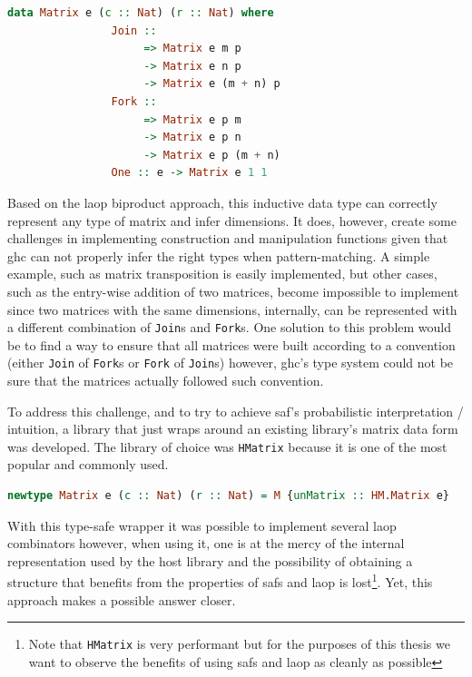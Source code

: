 \documentclass[
  oneside,
  11pt, a4paper,
  footinclude=true,
  headinclude=true,
  cleardoublepage=empty
]{scrbook}
\theoremstyle{definition}
\theoremstyle{definition}
\begin{document}
        \begin{lstlisting}[language=Haskell, label={lst:nat-matrix}, caption={Inductive matrix definition},captionpos=b]
            data Matrix e (c :: Nat) (r :: Nat) where
                Join :: 
                     => Matrix e m p 
                     -> Matrix e n p 
                     -> Matrix e (m + n) p
                Fork ::
                     => Matrix e p m 
                     -> Matrix e p n 
                     -> Matrix e p (m + n)
                One :: e -> Matrix e 1 1
        \end{lstlisting}{}
        
        Based on the \gls{laop} biproduct approach, this inductive data type can correctly represent any type of matrix and infer dimensions. It does, however, create some challenges in implementing construction and manipulation functions given that \gls{ghc} can not properly infer the right types when pattern-matching. A simple example, such as matrix transposition is easily implemented, but other cases, such as the entry-wise addition of two matrices, become impossible to implement since two matrices with the same dimensions, internally, can be represented with a different combination of \texttt{Join}s and \texttt{Fork}s. One solution to this problem would be to find a way to ensure that all matrices were built according to a convention (either \texttt{Join} of \texttt{Fork}s or \texttt{Fork} of \texttt{Join}s) however, \gls{ghc}'s type system could not be sure that the matrices actually followed such convention.
	    
	    To address this challenge, and to try to achieve \gls{saf}'s probabilistic interpretation / intuition, a library that just wraps around an existing library's matrix data form was developed. The library of choice was \texttt{HMatrix} \citep{hmatrix} because it is one of the most popular and commonly used.
	    
        \begin{lstlisting}[language=Haskell, label={lst:m-type-2}, caption={Type-safe wrapper around HMatrix},captionpos=b]
        newtype Matrix e (c :: Nat) (r :: Nat) = M {unMatrix :: HM.Matrix e}
        \end{lstlisting}{}
        
        With this type-safe wrapper it was possible to implement several \gls{laop} combinators however, when using it, one is at the mercy of the internal representation used by the host library and the possibility of obtaining a structure that benefits from the properties of \glspl{saf} and \gls{laop} is lost\footnote{Note that \texttt{HMatrix} is very performant but for the purposes of this thesis we want to observe the benefits of using \glspl{saf} and \gls{laop} as cleanly as possible}. Yet, this approach makes a possible answer closer. 
        
\end{document}
